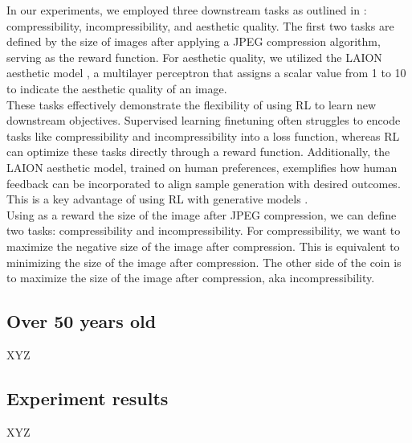 In our experiments, we employed three downstream tasks as outlined in \citet{black2023training}: compressibility, incompressibility, and aesthetic quality. The first two tasks are defined by the size of images after applying a JPEG compression algorithm, serving as the reward function. For aesthetic quality, we utilized the LAION aesthetic model \citep{laionaesthetic}, a multilayer perceptron that assigns a scalar value from 1 to 10 to indicate the aesthetic quality of an image. \\


These tasks effectively demonstrate the flexibility of using RL to learn new downstream objectives. Supervised learning finetuning often struggles to encode tasks like compressibility and incompressibility into a loss function, whereas RL can optimize these tasks directly through a reward function. Additionally, the LAION aesthetic model, trained on human preferences, exemplifies how human feedback can be incorporated to align sample generation with desired outcomes. This is a key advantage of using RL with generative models \citep{ouyang2022training}. \\


 Using as a reward the size of the image after JPEG compression, we can 
 define two tasks: compressibility and incompressibility. For compressibility,
 we want to maximize the negative size of the image after compression. This
is equivalent to minimizing the size of the image after compression. 
The other side of the coin is to maximize the size of the image after compression, aka incompressibility. \\
  
 \subsection{Over 50 years old}

 XYZ

 \subsection{Experiment results}

 XYZ

